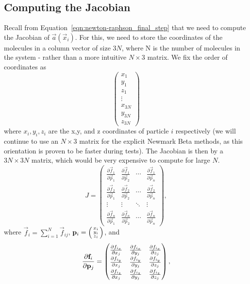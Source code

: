 \documentclass[../Main.tex]{subfiles}
\begin{document}
\subsection{Computing the Jacobian}

Recall from Equation~\ref{eqn:newton-raphson_final_step} that we need to compute the Jacobian of $\vec{a}\left(\vec{x}_{i}\right)$. For this, we need to store the coordinates of the molecules in a column vector of size $3N$, where N is the number of molecules in the system - rather than a more intuitive $N \times 3$ matrix. We fix the order of coordinates as
$$
\begin{pmatrix}
	x_{1} \\ y_{1} \\ z_{1} \\
	\vdots \\
	x_{3N} \\ y_{3N} \\ z_{3N}
\end{pmatrix}  
$$ where $x_{i}, y_{i}, z_{i}$ are the x,y, and z coordinates of particle $i$ respectively (we will continue to use an $N \times 3$ matrix for the explicit Newmark Beta methods, as this orientation is proven to be faster during tests). The Jacobian is then by a $3N \times 3N$ matrix, which would be very expensive to compute for large $N$.
$$
\renewcommand\arraystretch{1.5}
J = \begin{pmatrix}
\frac{\partial \vec{f}_{1}}{\partial \vec{p}_{1}} & \frac{\partial \vec{f}_{1}}{\partial \vec{p}_{2}} & \cdots & \frac{\partial \vec{f}_{1}}{\partial \vec{p}_{n}} \\
\frac{\partial \vec{f}_{2}}{\partial \vec{p}_{1}} & \frac{\partial \vec{f}_{2}}{\partial \vec{p}_{2}} & \cdots & \frac{\partial \vec{f}_{2}}{\partial \vec{p}_{n}} \\
\vdots & \vdots & \ddots & \vdots \\
\frac{\partial \vec{f}_{n}}{\partial \vec{p}_{1}} & \frac{\partial \vec{f}_{n}}{\partial \vec{p}_{2}} & \cdots & \frac{\partial \vec{f}_{n}}{\partial \vec{p}_{n}}
\end{pmatrix},
$$
where $\vec{f}_{i} = \sum_{i=1}^{N} \vec{f}_{ij}$, $\vec{p}_{i} = \begin{psmallmatrix} x_{i} \\ y_{i} \\ z_{i} \end{psmallmatrix}$, and \\
\begin{align}
\renewcommand\arraystretch{1.5}
\frac{\partial \vec{f}_{i}}{\partial \vec{p}_{j}} =
	\begin{pmatrix}
		\frac{\partial f_{i_{x}}}{\partial x_{j}}  & \frac{\partial f_{i_{x}}}{\partial y_{j}} & \frac{\partial f_{i_{x}}}{\partial z_{j}} \\
		\frac{\partial f_{i_{y}}}{\partial x_{j}}  & \frac{\partial f_{i_{y}}}{\partial y_{j}} & \frac{\partial f_{i_{y}}}{\partial z_{j}} \\
		\frac{\partial f_{i_{z}}}{\partial x_{j}}  & \frac{\partial f_{i_{z}}}{\partial y_{j}} & \frac{\partial f_{i_{z}}}{\partial z_{j}} 	
	\end{pmatrix}, \label{eqn:block_derivative_fi_pj}
\end{align}
\end{document}
